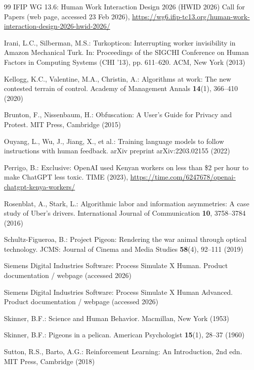 \documentclass[runningheads]{llncs}
\begin{document}
\begin{thebibliography}{99}
IFIP WG 13.6: Human Work Interaction Design 2026 (HWID 2026) Call for Papers (web page, accessed 23 Feb 2026), \url{https://wg6.ifip-tc13.org/human-work-interaction-design-2026-hwid-2026/}

Irani, L.C., Silberman, M.S.: Turkopticon: Interrupting worker invisibility in Amazon Mechanical Turk. In: Proceedings of the SIGCHI Conference on Human Factors in Computing Systems (CHI '13), pp. 611--620. ACM, New York (2013)

Kellogg, K.C., Valentine, M.A., Christin, A.: Algorithms at work: The new contested terrain of control. Academy of Management Annals \textbf{14}(1), 366--410 (2020)

Brunton, F., Nissenbaum, H.: Obfuscation: A User's Guide for Privacy and Protest. MIT Press, Cambridge (2015)

Ouyang, L., Wu, J., Jiang, X., et al.: Training language models to follow instructions with human feedback. arXiv preprint arXiv:2203.02155 (2022)

Perrigo, B.: Exclusive: OpenAI used Kenyan workers on less than \$2 per hour to make ChatGPT less toxic. TIME (2023), \url{https://time.com/6247678/openai-chatgpt-kenya-workers/}

Rosenblat, A., Stark, L.: Algorithmic labor and information asymmetries: A case study of Uber's drivers. International Journal of Communication \textbf{10}, 3758--3784 (2016)

Schultz-Figueroa, B.: Project Pigeon: Rendering the war animal through optical technology. JCMS: Journal of Cinema and Media Studies \textbf{58}(4), 92--111 (2019)

Siemens Digital Industries Software: Process Simulate X Human. Product documentation / webpage (accessed 2026)

Siemens Digital Industries Software: Process Simulate X Human Advanced. Product documentation / webpage (accessed 2026)

Skinner, B.F.: Science and Human Behavior. Macmillan, New York (1953)

Skinner, B.F.: Pigeons in a pelican. American Psychologist \textbf{15}(1), 28--37 (1960)

Sutton, R.S., Barto, A.G.: Reinforcement Learning: An Introduction, 2nd edn. MIT Press, Cambridge (2018)


\end{thebibliography}
\end{document}
